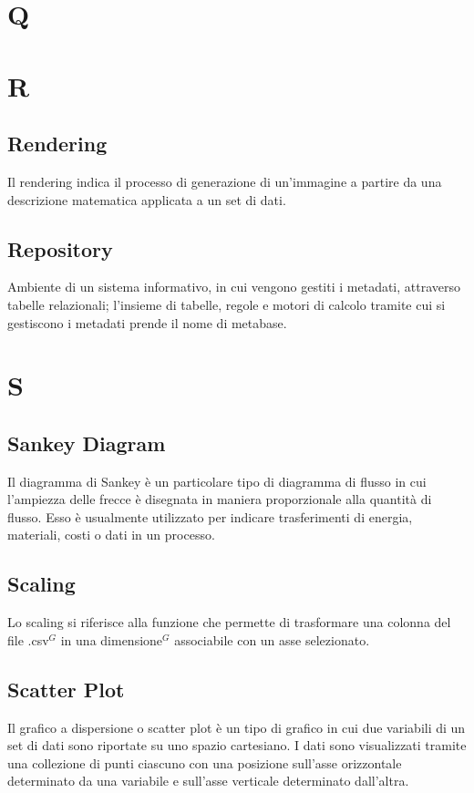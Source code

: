 \section{Q}

\newpage
\section{R}

\subsection{Rendering}
Il rendering indica il processo di generazione di un'immagine a partire da una descrizione matematica applicata a un set di dati.

\subsection{Repository}
Ambiente di un sistema informativo, in cui vengono gestiti i metadati, attraverso tabelle relazionali;
l’insieme di tabelle, regole e motori di calcolo tramite cui si gestiscono i metadati prende il nome di
metabase.

\newpage
\section{S}
\subsection{Sankey Diagram}
Il diagramma di Sankey è un particolare tipo di diagramma di flusso in cui l'ampiezza delle frecce è disegnata in maniera proporzionale alla quantità di flusso.
Esso è usualmente utilizzato per indicare trasferimenti di energia, materiali, costi o dati in un processo.

\subsection{Scaling}
Lo scaling si riferisce alla funzione che permette di trasformare una colonna del file .csv$^{G}$ in una dimensione$^{G}$ associabile con un asse selezionato.

\subsection{Scatter Plot}
Il grafico a dispersione o scatter plot è un tipo di grafico in cui due variabili di un set di dati sono riportate su uno spazio cartesiano.
I dati sono visualizzati tramite una collezione di punti ciascuno con una posizione sull'asse orizzontale determinato da una variabile e sull'asse verticale determinato dall'altra. 

